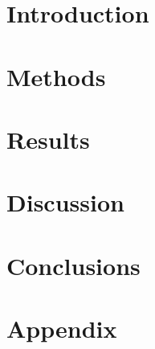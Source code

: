 \documentclass[preprint,12pt,authoryear]{elsarticle}
\begin{document}
  
  


  \section{Introduction}
  \label{sec:introduction}
  


  \section{Methods}
  \label{sec:methods}
  


  \section{Results}
  \label{sec:results}
  


  \section{Discussion}
  \label{sec:discussion}
  


  \section{Conclusions}
  \label{sec:conclusions}
  


  \section{Appendix}
  \label{sec:appendix}
  

  
  
\end{document}
